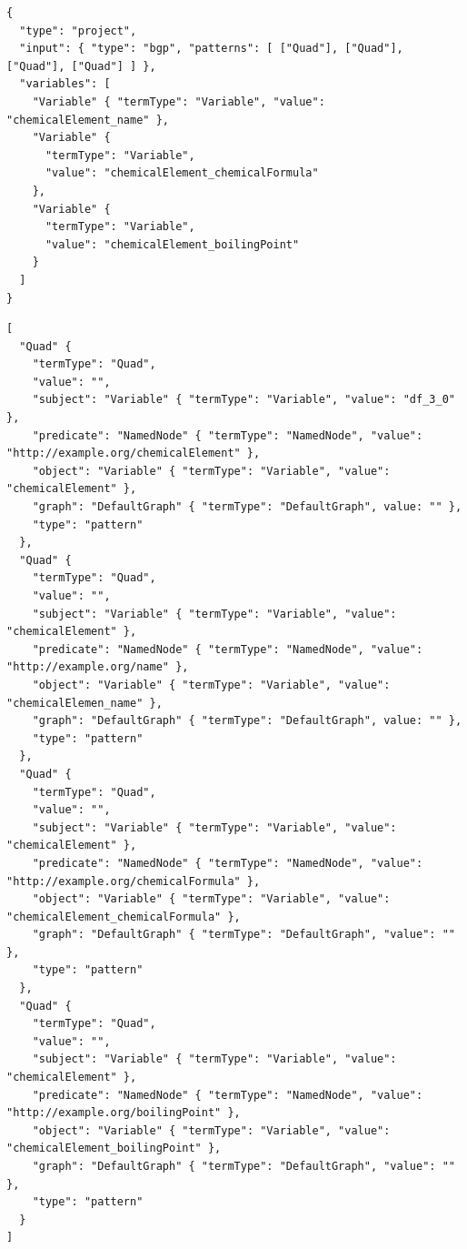 \begin{minipage}{\linewidth}
\begin{lstlisting}[label=lst:10, caption={Generated SPARQL Algebra expression}, language=GraphQLException]
{
  "type": "project",
  "input": { "type": "bgp", "patterns": [ ["Quad"], ["Quad"], ["Quad"], ["Quad"] ] },
  "variables": [
    "Variable" { "termType": "Variable", "value": "chemicalElement_name" },
    "Variable" {
      "termType": "Variable",
      "value": "chemicalElement_chemicalFormula"
    },
    "Variable" {
      "termType": "Variable",
      "value": "chemicalElement_boilingPoint"
    }
  ]
}
\end{lstlisting}
\end{minipage}


\begin{minipage}{\linewidth}
\begin{lstlisting}[columns=fullflexible, label=lst:11, caption={The expansion of Quads}, language=GraphQLException2]
[
  "Quad" {
    "termType": "Quad",
    "value": "",
    "subject": "Variable" { "termType": "Variable", "value": "df_3_0" },
    "predicate": "NamedNode" { "termType": "NamedNode", "value": "http://example.org/chemicalElement" },
    "object": "Variable" { "termType": "Variable", "value": "chemicalElement" },
    "graph": "DefaultGraph" { "termType": "DefaultGraph", value: "" },
    "type": "pattern"
  },
  "Quad" {
    "termType": "Quad",
    "value": "",
    "subject": "Variable" { "termType": "Variable", "value": "chemicalElement" },
    "predicate": "NamedNode" { "termType": "NamedNode", "value": "http://example.org/name" },
    "object": "Variable" { "termType": "Variable", "value": "chemicalElemen_name" },
    "graph": "DefaultGraph" { "termType": "DefaultGraph", value: "" },
    "type": "pattern"
  },
  "Quad" {
    "termType": "Quad",
    "value": "",
    "subject": "Variable" { "termType": "Variable", "value": "chemicalElement" },
    "predicate": "NamedNode" { "termType": "NamedNode", "value": "http://example.org/chemicalFormula" },
    "object": "Variable" { "termType": "Variable", "value": "chemicalElement_chemicalFormula" },
    "graph": "DefaultGraph" { "termType": "DefaultGraph", "value": "" },
    "type": "pattern"
  },
  "Quad" {
    "termType": "Quad",
    "value": "",
    "subject": "Variable" { "termType": "Variable", "value": "chemicalElement" },
    "predicate": "NamedNode" { "termType": "NamedNode", "value": "http://example.org/boilingPoint" },
    "object": "Variable" { "termType": "Variable", "value": "chemicalElement_boilingPoint" },
    "graph": "DefaultGraph" { "termType": "DefaultGraph", "value": "" },
    "type": "pattern"
  }
]
\end{lstlisting}
\end{minipage}

